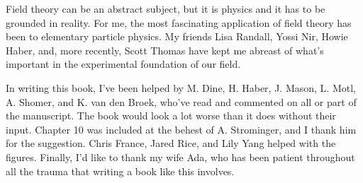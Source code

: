Field theory can be an abstract subject, but it is physics and it has to be
grounded in reality.  For me, the most fascinating application of field theory
has been to elementary particle physics.  My friends Lisa Randall, Yossi Nir,
Howie Haber, and, more recently, Scott Thomas have kept me abreast of what's
important in the experimental foundation of our field.

In writing this book, I've been helped by M. Dine, H. Haber, J. Mason, L.
Motl, A. Shomer, and K. van den Broek, who've read and commented on all or part
of the manuscript.  The book would look a lot worse than it does without their
input.  Chapter 10 was included at the behest of A. Strominger, and I thank
him for the suggestion.  Chris France, Jared Rice, and Lily Yang helped with
the figures.  Finally, I'd like to thank my wife Ada, who has been patient
throughout all the trauma that writing a book like this involves.
